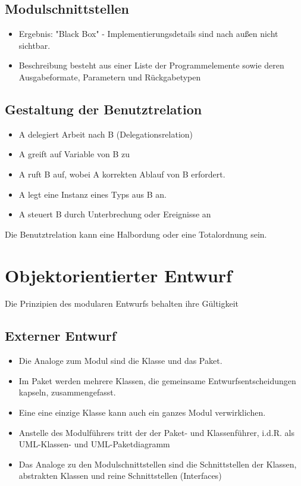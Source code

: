 \subsection{Modulschnittstellen}
\begin{itemize}
    \item Ergebnis: "Black Box" - Implementierungsdetails sind nach außen nicht sichtbar.
    \item Beschreibung besteht aus einer Liste der Programmelemente sowie deren Ausgabeformate, Parametern und Rückgabetypen
\end{itemize}

\subsection{Gestaltung der Benutztrelation}
\begin{itemize}
    \item A delegiert Arbeit nach B (Delegationsrelation)
    \item A greift auf Variable von B zu
    \item A ruft B auf, wobei A korrekten Ablauf von B erfordert. 
    \item A legt eine Instanz eines Typs aus B an.
    \item A steuert B durch Unterbrechung oder Ereignisse an
\end{itemize}
Die Benutztrelation kann eine Halbordung oder eine Totalordnung sein.
\newpage
\section{Objektorientierter Entwurf}

Die Prinzipien des modularen Entwurfs behalten ihre Gültigkeit

\subsection{Externer Entwurf}
\begin{itemize}
    \item Die Analoge zum Modul sind die Klasse und das Paket.
    \item Im Paket werden mehrere Klassen, die gemeinsame Entwurfsentscheidungen kapseln, zusammengefasst.
    \item Eine eine einzige Klasse kann auch ein ganzes Modul verwirklichen.
    \item Anstelle des Modulführers tritt der der Paket- und Klassenführer, i.d.R. als UML-Klassen- und UML-Paketdiagramm
    \item Das Analoge zu den Modulschnittstellen sind die Schnittstellen der Klassen, abstrakten Klassen und reine Schnittstellen (Interfaces)
\end{itemize}

